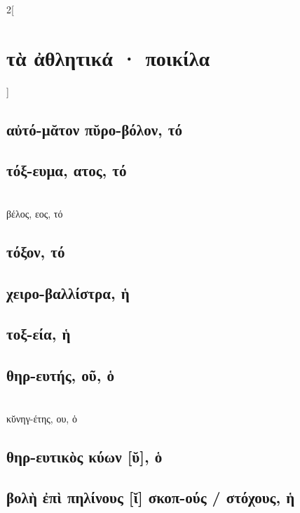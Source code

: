 \documentclass{book}
\begin{document}
\begin{multicols}{2}[\section{τὰ ἀθλητικά · ποικίλα}]
\subsection{αὐτό-μᾰτον πῠρο-βόλον, τό}
\subsection{τόξ-ευμα, ατος, τό}
 ~\\
βέλος, εος, τό
\subsection{τόξον, τό}
\subsection{χειρο-βαλλίστρα, ἡ}
\subsection{τοξ-εία, ἡ}
\subsection{θηρ-ευτής, οῦ, ὁ}
 ~\\
κῠνηγ-έτης, ου, ὁ 
\subsection{θηρ-ευτικὸς κύων [ῠ], ὁ}
\subsection{βολὴ ἐπὶ πηλίνους [ῐ] σκοπ-ούς  / στόχους, ἡ}      
~
\end{multicols}
\newpage  
\end{document}
